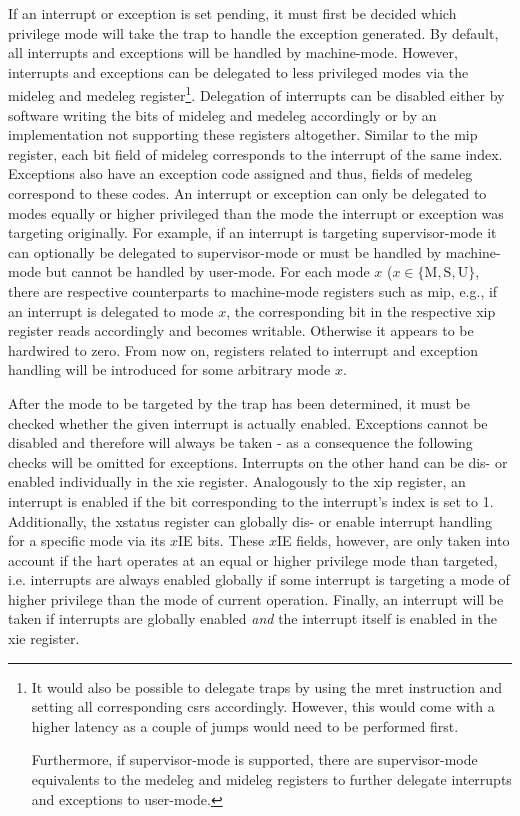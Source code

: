 If an interrupt or exception is set pending, it must first be decided which privilege mode will take the trap to handle the exception generated.
By default, all interrupts and exceptions will be handled by machine-mode.
However, interrupts and exceptions can be delegated to less privileged modes via the \gls{mideleg} and \gls{medeleg} register\footnote{%
    It would also be possible to delegate traps by using the \gls{mret} instruction and setting all corresponding \glspl{csr} accordingly.
    However, this would come with a higher latency as a couple of jumps would need to be performed first.

    Furthermore, if supervisor-mode is supported, there are supervisor-mode equivalents to the \gls{medeleg} and \gls{mideleg} registers to further delegate interrupts and exceptions to user-mode.
}.
Delegation of interrupts can be disabled either by software writing the bits of \gls{mideleg} and \gls{medeleg} accordingly or by an implementation not supporting these registers altogether.
Similar to the \gls{mip} register, each bit field of \gls{mideleg} corresponds to the interrupt of the same index.
Exceptions also have an exception code assigned and thus, fields of \gls{medeleg} correspond to these codes.
An interrupt or exception can only be delegated to modes equally or higher privileged than the mode the interrupt or exception was targeting originally.
For example, if an interrupt is targeting supervisor-mode it can optionally be delegated to supervisor-mode or must be handled by machine-mode but cannot be handled by user-mode.
For each mode $ x $ ($ x \in \{ \text{M}, \text{S}, \text{U}\} $, there are respective counterparts to machine-mode registers such as \gls{mip}, e.g., if an interrupt is delegated to mode $ x $, the corresponding bit in the respective \gls{xip} register reads accordingly and becomes writable.
Otherwise it appears to be hardwired to zero.
From now on, registers related to interrupt and exception handling will be introduced for some arbitrary mode $ x $.

After the mode to be targeted by the trap has been determined, it must be checked whether the given interrupt is actually enabled.
Exceptions cannot be disabled and therefore will always be taken - as a consequence the following checks will be omitted for exceptions.
Interrupts on the other hand can be dis- or enabled individually in the \gls{xie} register.
Analogously to the \gls{xip} register, an interrupt is enabled if the bit corresponding to the interrupt's index is set to 1.
Additionally, the \gls{xstatus} register can globally dis- or enable interrupt handling for a specific mode via its $x$IE bits.
These $x$IE fields, however, are only taken into account if the \gls{hart} operates at an equal or higher privilege mode than targeted, i.e. interrupts are always enabled globally if some interrupt is targeting a mode of higher privilege than the mode of current operation.
Finally, an interrupt will be taken if interrupts are globally enabled \textit{and} the interrupt itself is enabled in the \gls{xie} register.

